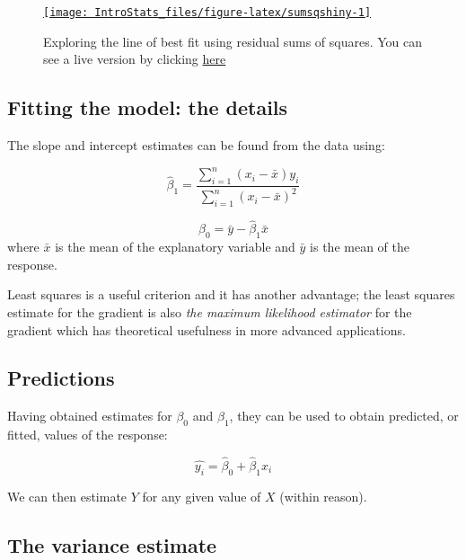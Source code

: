 \documentclass[
  oneside]{krantz}
\begin{document}
\begin{figure}

{\centering \href{https://moniquemackenzie.shinyapps.io/IntroStats_SumsSq/}{\texttt{[image: IntroStats\_files/figure-latex/sumsqshiny-1]} }

}

\caption{Exploring the line of best fit using residual sums of squares. You can see a live version by clicking \href{https://moniquemackenzie.shinyapps.io/IntroStats_SumsSq/}{here}}\label{fig:sumsqshiny}
\end{figure}

\hypertarget{fitting-the-model-the-details}{%
\subsection{Fitting the model: the details}\label{fitting-the-model-the-details}}

The slope and intercept estimates can be found from the data using:

\[\hat{\beta}_1=\frac{\sum_{i=1}^{n}(x_i-\bar{x})y_i}{\sum_{i=1}^{n}(x_i-\bar{x})^2}\]

\[\hat{\beta}_0=\bar{y} - \hat{\beta}_1\bar{x}\]
where \(\bar{x}\) is the mean of the explanatory variable and \(\bar{y}\) is the mean of the response.

Least squares is a useful criterion and it has another advantage; the least squares estimate for the gradient is also \emph{the maximum likelihood estimator} for the gradient which has theoretical usefulness in more advanced applications.

\hypertarget{predictions}{%
\subsection{Predictions}\label{predictions}}

Having obtained estimates for \(\beta_0\) and \(\beta_1\), they can be used to obtain predicted, or fitted, values of the response:

\[\hat{y_i}=\hat{\beta}_0+\hat{\beta}_1x_{i}\]

We can then estimate \(Y\) for any given value of \(X\) (within reason).

\hypertarget{the-variance-estimate}{%
\subsection{The variance estimate}\label{the-variance-estimate}}
\end{document}
